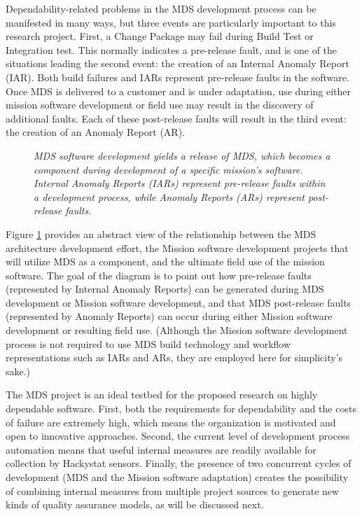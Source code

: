 Dependability-related problems in the MDS development process can be
manifested in many ways, but three events are particularly important to
this research project.  First, a Change Package may fail during Build Test
or Integration test.  This normally indicates a pre-release fault, and is
one of the situations leading the second event: the creation of an Internal
Anomaly Report (IAR).  Both build failures and IARs represent pre-release
faults in the software.  Once MDS is delivered to a customer and is under
adaptation, use during either mission software development or field use may
result in the discovery of additional faults.  Each of these post-release
faults will result in the third event: the creation of an Anomaly Report (AR).

\begin{figure}[t]
 {\centerline {}}
 \caption{{\em MDS software development yields a release of MDS, which 
 becomes a component during development of a specific mission's
 software. Internal
Anomaly Reports (IARs) represent pre-release faults within a development process, while 
Anomaly Reports (ARs) represent post-release faults.}}
 \label{fig:MDSdev}
\end{figure}

Figure \ref{fig:MDSdev} provides an abstract view of the relationship
between the MDS architecture development effort, the Mission software
development projects that will utilize MDS as a component, and the ultimate
field use of the mission software.  The goal of the diagram is to point out
how pre-release faults (represented by Internal Anomaly Reports) can be
generated during MDS development or Mission software development, and that
MDS post-release faults (represented by Anomaly Reports) can occur during
either Mission software development or resulting field use.  (Although the
Mission software development process is not required to use MDS build
technology and workflow representations such as IARs and ARs, they are
employed here for simplicity's sake.)

The MDS project is an ideal testbed for the proposed research on highly
dependable software. First, both the requirements for dependability and the
costs of failure are extremely high, which means the organization is
motivated and open to innovative approaches.  Second, the current level of
development process automation means that useful internal measures are
readily available for collection by Hackystat sensors.  Finally, the
presence of two concurrent cycles of development (MDS and the Mission
software adaptation) creates the possibility of combining internal measures 
from multiple project sources to generate new kinds of quality assurance
models, as will be discussed next.


